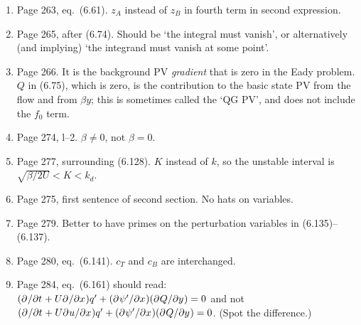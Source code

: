 \documentclass[10pt]{article}
\newcommand{\eq}{eq.\ } \newcommand{\Eq}{Eq.\ }
\begin{document}
\begin{enumerate}
\item Page 263, \eq (6.61). $z_A$ instead of $z_B$ in fourth term in second expression.

\item Page 265, after (6.74). Should be `the integral must vanish', or alternatively (and implying) `the integrand must vanish at some point'.


\item Page 266. It is the background PV \emph{gradient} that is zero in the Eady problem. $Q$ in (6.75), which is zero, is the contribution to the basic state PV from the flow and from $\beta y$; this is sometimes called the `QG PV', and does not include the $f_0$ term.




\item Page 274, l--2. $\beta \neq 0$, not $\beta = 0$.

\item Page 277, surrounding (6.128). $K$ instead of $k$, so the unstable interval is $\sqrt{\beta/2U} < K < k_d$.

\item Page 275, first sentence of second section. No hats on variables.


\item Page 279. Better to have primes on the perturbation variables in (6.135)--(6.137).

\item Page 280, \eq (6.141). $c_T$ and $c_B$ are interchanged.


\item Page 284, \eq (6.161) should read: $({\partial^{}  / \partial t^{}} + U {\partial^{}  / \partial x^{}}) q' + ({\partial^{} \psi' / \partial x^{}})( {\partial^{} Q / \partial y^{}}) = 0 $ and not $({\partial^{}  / \partial t^{}} + U {\partial^{} u / \partial x^{}}) q' + ({\partial^{} \psi' / \partial x^{}}) ( {\partial^{} Q / \partial y^{}} )= 0 $. (Spot the difference.)


\end{enumerate}
\end{document}
